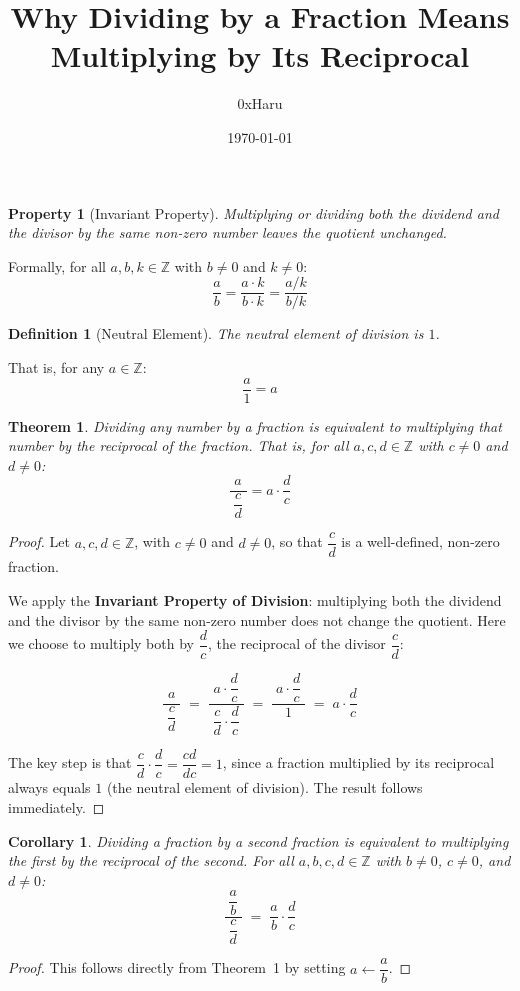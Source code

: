 \documentclass[12pt, a4paper]{article}
\title{\textbf{Why Dividing by a Fraction Means Multiplying by Its Reciprocal}}
\author{0xHaru}
\date{\today}
\theoremstyle{propertystyle}
\newtheorem{property}{Property}
\newtheorem{definition}{Definition}
\newtheorem{theorem}{Theorem}
\begin{document}
\maketitle
\thispagestyle{empty}

\begin{property}[Invariant Property]
  Multiplying or dividing both the dividend and the divisor by the same
  non-zero number leaves the quotient unchanged.
\end{property}

\noindent Formally, for all $a, b, k \in \mathbb{Z}$ with $b \neq 0$ and $k \neq 0$:
\[
  \frac{a}{b} = \frac{a \cdot k}{b \cdot k} = \frac{a / k}{b / k}
\]

\begin{definition}[Neutral Element]
  The neutral element of division is $1$.
\end{definition}

\noindent That is, for any $a \in \mathbb{Z}$:
\[
  \frac{a}{1} = a
\]

\begin{theorem}
  Dividing any number by a fraction is equivalent to multiplying that number
  by the reciprocal of the fraction. That is, for all $a, c, d \in \mathbb{Z}$
  with $c \neq 0$ and $d \neq 0$:
  \[
    \dfrac{a}{\;\dfrac{c}{d}\;} = a \cdot \dfrac{d}{c}
  \]
\end{theorem}

\begin{proof}
Let $a, c, d \in \mathbb{Z}$, with $c \neq 0$ and $d \neq 0$, so that
$\dfrac{c}{d}$ is a well-defined, non-zero fraction.

\medskip
\noindent We apply the \textbf{Invariant Property of Division}: multiplying both the
dividend and the divisor by the same non-zero number does not change the quotient.
Here we choose to multiply both by $\dfrac{d}{c}$, the reciprocal of the
divisor $\dfrac{c}{d}$:

\[
  \dfrac{\;a\;}{\;\dfrac{c}{d}\;}
  \;=\;
  \dfrac{\;a \cdot \dfrac{d}{c}\;}
        {\;\dfrac{c}{d} \cdot \dfrac{d}{c}\;}
  \;=\;
  \dfrac{\;a \cdot \dfrac{d}{c}\;}
        {\;1\;}
  \;=\;
  a \cdot \dfrac{d}{c}
\]

\medskip
\noindent The key step is that $\dfrac{c}{d} \cdot \dfrac{d}{c} = \dfrac{cd}{dc} = 1$,
since a fraction multiplied by its reciprocal always equals $1$ (the neutral element
of division). The result follows immediately.
\end{proof}

\newtheorem{corollary}{Corollary}
\begin{corollary}
  Dividing a fraction by a second fraction is equivalent to multiplying the
  first by the reciprocal of the second. For all $a, b, c, d \in \mathbb{Z}$
  with $b \neq 0$, $c \neq 0$, and $d \neq 0$:
  \[
    \dfrac{\;\dfrac{a}{b}\;}{\;\dfrac{c}{d}\;}
    \;=\;
    \dfrac{a}{b} \cdot \dfrac{d}{c}
  \]
\end{corollary}

\begin{proof}
  This follows directly from Theorem~1 by setting $a \leftarrow \dfrac{a}{b}$.
\end{proof}
\end{document}
